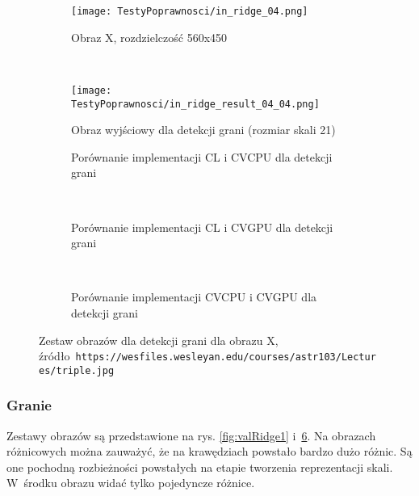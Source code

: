\begin{figure}[h]

\begin{center}
\begin{subfigure}[t]{0.3\textwidth}
\texttt{[image: TestyPoprawnosci/in\_ridge\_04.png]}
\caption{Obraz X, rozdzielczość 560x450}
\label{fig:valRidge04}
\end{subfigure}
~
\begin{subfigure}[t]{0.3\textwidth}
\texttt{[image: TestyPoprawnosci/in\_ridge\_result\_04\_04.png]}
\caption{Obraz wyjściowy dla detekcji grani (rozmiar skali 21)}
\label{fig:valRidgeResult04}
\end{subfigure}
\end{center}

\begin{subfigure}[t]{0.3\textwidth}
	\centering
	\setlength\fboxsep{0pt}
	\setlength\fboxrule{0.5pt}
	\caption{Porównanie implementacji CL i CVCPU dla detekcji grani}
	\label{fig:valRidge4CLCVCPU}
\end{subfigure}
~
\begin{subfigure}[t]{0.3\textwidth}
	\centering
	\setlength\fboxsep{0pt}
	\setlength\fboxrule{0.5pt}
	\caption{Porównanie implementacji CL i CVGPU dla detekcji grani}
	\label{fig:valRidge4CLCVGPU}
\end{subfigure}
~
\begin{subfigure}[t]{0.3\textwidth}
	\centering
	\setlength\fboxsep{0pt}
	\setlength\fboxrule{0.5pt}
	\caption{Porównanie implementacji CVCPU i CVGPU dla detekcji grani}
	\label{fig:valRidge4CVCPUCVGPU}                 
\end{subfigure}
\caption{Zestaw obrazów dla detekcji grani dla obrazu X, \tiny{źródło~\texttt{https://wesfiles.wesleyan.edu/courses/astr103/Lectures/triple.jpg}}}

\label{fig:valRidge4}
\end{figure}

\subsubsection{Granie}
\label{subsubsec:granieRysunki}

Zestawy obrazów są przedstawione na rys. \ref{fig:valRidge1} i~\ref{fig:valRidge4}. Na obrazach różnicowych można zauważyć, że na krawędziach powstało bardzo dużo różnic. Są one pochodną rozbieżności powstałych na etapie tworzenia reprezentacji skali. W~środku obrazu widać tylko pojedyncze różnice. 
